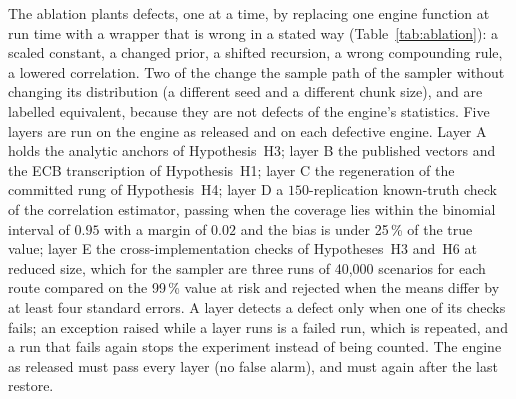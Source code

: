 The ablation plants \ablMutants{} defects, one at a time, by replacing one engine function at run time with a wrapper that is wrong in a stated way (Table~\ref{tab:ablation}): a scaled constant, a changed prior, a shifted recursion, a wrong compounding rule, a lowered correlation. Two of the \ablMutants{} change the sample path of the sampler without changing its distribution (a different seed and a different chunk size), and are labelled equivalent, because they are not defects of the engine's statistics. Five layers are run on the engine as released and on each defective engine. Layer A holds the analytic anchors of Hypothesis~H3; layer B the published vectors and the ECB transcription of Hypothesis~H1; layer C the regeneration of the committed rung of Hypothesis~H4; layer D a $150$-replication known-truth check of the correlation estimator, passing when the coverage lies within the binomial interval of $0.95$ with a margin of $0.02$ and the bias is under 25\,\% of the true value; layer E the cross-implementation checks of Hypotheses~H3 and~H6 at reduced size, which for the sampler are three runs of 40,000 scenarios for each route compared on the 99\,\% value at risk and rejected when the means differ by at least four standard errors. A layer detects a defect only when one of its checks fails; an exception raised while a layer runs is a failed run, which is repeated, and a run that fails again stops the experiment instead of being counted. The engine as released must pass every layer (no false alarm), and must again after the last restore.
